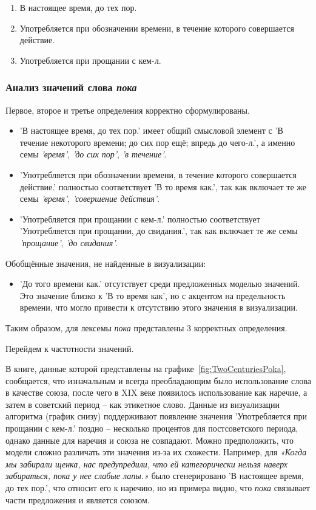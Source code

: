 \documentclass[LI,VKR]{HSEUniversity}
\begin{document}
\begin{enumerate}
    \item В настоящее время, до тех пор.
    \item Употребляется при обозначении времени, в течение которого совершается действие.
    \item Употребляется при прощании с кем-л.
\end{enumerate}

\subsubsection*{Анализ значений слова \textit{пока}}

Первое, второе и третье определения корректно сформулированы.

\begin{itemize}
    \item ’В настоящее время, до тех пор.’ имеет общий смысловой элемент с
’В течение некоторого времени; до сих пор ещё; впредь до чего-л.’,
а именно семы \textit{’время’}, \textit{’до сих пор’}, \textit{’в течение’}.

    \item ’Употребляется при обозначении времени, в течение которого совершается действие.’ полностью соответствует
’В то время как.’, так как включает те же семы \textit{’время’}, \textit{’совершение действия’}.

    \item ’Употребляется при прощании с кем-л.’ полностью соответствует
’Употребляется при прощании, до свидания.’, так как включает те же семы \textit{’прощание’}, \textit{’до свидания’}.
\end{itemize}

Обобщённые значения, не найденные в визуализации:
\begin{itemize}
    \item ’До того времени как.’ отсутствует среди предложенных моделью значений.
Это значение близко к ’В то время как’, но с акцентом на предельность времени,
что могло привести к отсутствию этого значения в визуализации.
\end{itemize}

Таким образом, для лексемы \textit{пока} представлены 3 корректных определения.

Перейдем к частотности значений.

В книге, данные которой представлены на графике~\ref{fig:TwoCenturiesPoka}, сообщается,
что изначальным и всегда преобладающим было использование слова в качестве
союза, после чего в XIX веке появилось использование как наречие, а затем в советский период
– как этикетное слово.
Данные из визуализации алгоритма (график снизу) поддерживают появление значения
’Употребляется при прощании с кем-л.’
поздно – несколько процентов для постсоветского периода, однако данные для наречия и союза
не совпадают.
Можно предположить, что модели сложно различать эти значения из-за их схожести.
Например, для
\textit{«Когда мы забирали щенка, нас предупредили, что ей категорически нельзя наверх забираться,
пока у нее слабые лапы.»}
было сгенерировано ’В настоящее время, до тех пор.’,
что относит его к наречию,
но из примера видно, что \textit{пока} связывает части предложения и является союзом.
\end{document}
